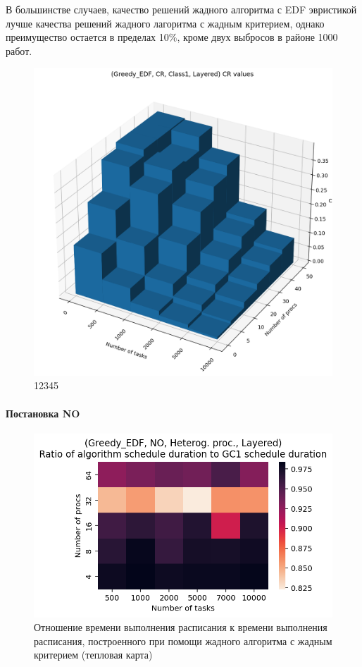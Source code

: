 В большинстве случаев, качество решений жадного алгоритма с EDF эвристикой лучше качества решений жадного лагоритма с жадным критерием, однако преимущество остается в пределах 10\%, кроме двух выбросов в районе 1000 работ. 

\begin{figure}[!htbp]
    \centering
    \includegraphics[width=\textwidth]{imgs/layered_class_1/CR_EDF/cr_3d.png}
    \caption{12345}
\end{figure}

\paragraph{Постановка NO}

\begin{figure}[!htbp]
    \centering
    \includegraphics[width=\textwidth]{imgs/unbalanced/NO_EDF/times.png}
    \caption{Отношение времени выполнения расписания к времени выполнения расписания, построенного при помощи жадного алгоритма с жадным критерием (тепловая карта)}
    \label{fig:NO-EDF-times-heatmap}
\end{figure}

